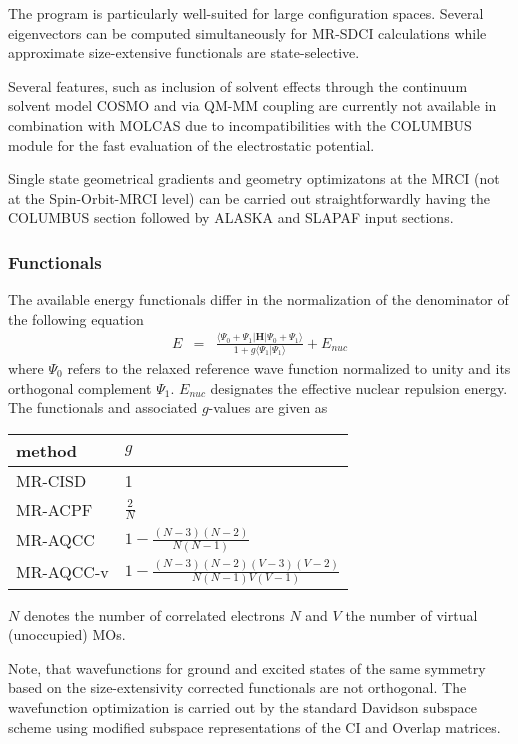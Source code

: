 The program is particularly well-suited for large configuration
spaces. Several eigenvectors can be computed simultaneously
for MR-SDCI calculations while approximate size-extensive 
functionals  are state-selective.  

Several features, such as inclusion of solvent effects through
the continuum solvent model COSMO \cite{Klamt:93} 
and via QM-MM coupling \cite{XX:XX} 
are currently not available in combination with MOLCAS due to 
incompatibilities with the COLUMBUS module for the fast evaluation
of the electrostatic potential. 

Single state geometrical gradients and geometry optimizatons at the MRCI 
(not at the Spin-Orbit-MRCI level) can be carried out straightforwardly 
having the COLUMBUS section followed by ALASKA and SLAPAF input sections. 

\subsubsection{Functionals}

The available energy functionals differ in the normalization of the denominator
of the following equation
\begin{eqnarray}
 E &=& \frac{\langle \Psi_0 + \Psi_1 \vert {\mathbf H} \vert \Psi_0 + \Psi_1 \rangle}
            {1 + g\langle\Psi_1\vert\Psi_1\rangle} + E_{nuc}
\end{eqnarray}
 where $\Psi_0$ refers to the relaxed reference wave function normalized to unity
 and its orthogonal complement $\Psi_1$. $E_{nuc}$ designates the effective nuclear
 repulsion energy. The functionals and associated $g$-values are given as

\begin{center}
\begin{tabular*}{0.5\hsize}{l@{\extracolsep\fill}l}
\hline
method & $g$ \\
\hline
MR-CISD & 1 \\
MR-ACPF & $\frac{2}{N}$ \\
MR-AQCC & $1-\frac{(N-3)(N-2)}{N(N-1)}$ \\
MR-AQCC-v & $1-\frac{(N-3)(N-2) (V-3)(V-2)}{N(N-1)V(V-1)}$ \\
\hline
\end{tabular*}

{\small $N$ denotes the number of correlated electrons $N$ and $V$ the number of virtual (unoccupied) MOs.}
\end{center}

Note, that wavefunctions for ground and excited states of the same symmetry
based on the size-extensivity corrected functionals are not orthogonal. 
The wavefunction optimization is carried out by the standard Davidson subspace scheme
using modified subspace representations of the CI and Overlap matrices\cite{Szalay:97}.

